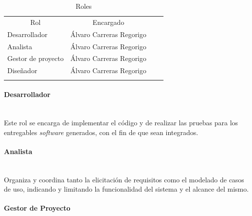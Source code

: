 \documentclass[twoside]{report}
\begin{document}
\begin{table}[H]
\begin{tabular}{llll}
\cline{1-2}
\multicolumn{1}{|c|}{Rol} & \multicolumn{1}{c|}{Encargado} &  &  \\ \cline{1-2}
\multicolumn{1}{|l|}{Desarrollador}                                      & \multicolumn{1}{l|}{Álvaro Carreras Regorigo}                                          &  &  \\ \cline{1-2}
\multicolumn{1}{|l|}{Analista}                                           & \multicolumn{1}{l|}{Álvaro Carreras Regorigo}                                          &  &  \\ \cline{1-2}
\multicolumn{1}{|l|}{Gestor de proyecto}                                 & \multicolumn{1}{l|}{Álvaro Carreras Regorigo}                                          &  &  \\ \cline{1-2}
\multicolumn{1}{|l|}{Diseñador}                                          & \multicolumn{1}{l|}{Álvaro Carreras Regorigo}                                                         &  &  \\ \cline{1-2}
                                                                         &                                                                               &  & 
\end{tabular}
\centering
\caption{Roles}
\end{table}
\vspace{0.5cm}

\paragraph{Desarrollador}\mbox{}\\

Este rol se encarga de implementar el código y de realizar las pruebas para los entregables \textit{software} generados, con el fin de que sean integrados.

\paragraph{Analista}\mbox{}\\

Organiza y coordina tanto la elicitación de requisitos como el modelado de casos de uso, indicando y limitando la funcionalidad del sistema y el alcance del mismo.

\paragraph{Gestor de Proyecto}\mbox{}\\
\end{document}
